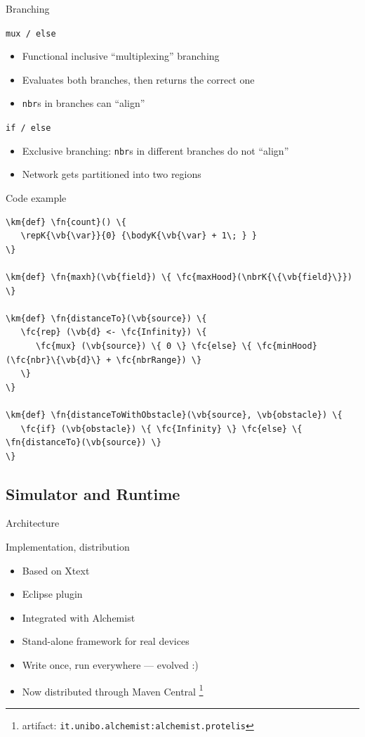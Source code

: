 \documentclass[presentation]{beamer} %
\newcommand{\km}[1]{\textcolor{purple}{#1}} %
\newcommand{\fc}[1]{\textcolor{Fuchsia}{#1}} %
\newcommand{\fn}[1]{\textcolor{blue}{#1}} %
\newcommand{\vb}[1]{\textcolor{OliveGreen}{#1}} %
\newcommand{\bral}{\textrm{{\tt {\char '173}}}\,}
\newcommand{\brar}{\textrm{{\tt {\char '175}}}}
\newcommand{\var}{\texttt{x}}
\newcommand{\bodyK}[1]{\bral\! #1\!\brar}
\newcommand{\repK}[3]{\texttt{\fc{rep}(#1<-#2)}#3}
\newcommand{\nbrK}[1]{\texttt{\fc{nbr}}#1}
\begin{document}
\begin{frame}{Branching}
  \begin{block} {\texttt{mux / else}}
   \begin{itemize}
    \item Functional inclusive ``multiplexing'' branching
    \item Evaluates both branches, then returns the correct one
    \item \texttt{nbr}s in branches can ``align''
   \end{itemize}
  \end{block}
  \begin{block} {\texttt{if / else}}
   \begin{itemize}
    \item Exclusive branching: \texttt{nbr}s in different branches do not ``align''
    \item Network gets partitioned into two regions
   \end{itemize}
  \end{block}
\end{frame}

\begin{frame}[fragile]{Code example}
\begin{Verbatim}[fontsize=\scriptsize, frame=single, commandchars=\\\{\}]
\km{def} \fn{count}() \{
   \repK{\vb{\var}}{0} {\bodyK{\vb{\var} + 1\; } }
\}

\km{def} \fn{maxh}(\vb{field}) \{ \fc{maxHood}(\nbrK{\{\vb{field}\}}) \}

\km{def} \fn{distanceTo}(\vb{source}) \{
   \fc{rep} (\vb{d} <- \fc{Infinity}) \{
      \fc{mux} (\vb{source}) \{ 0 \} \fc{else} \{ \fc{minHood}(\fc{nbr}\{\vb{d}\} + \fc{nbrRange}) \}
   \}
\}

\km{def} \fn{distanceToWithObstacle}(\vb{source}, \vb{obstacle}) \{
   \fc{if} (\vb{obstacle}) \{ \fc{Infinity} \} \fc{else} \{ \fn{distanceTo}(\vb{source}) \}
\}
\end{Verbatim}
\end{frame}

\subsection{Simulator and Runtime}

\begin{frame}{Architecture}
  \begin{block} {Implementation, distribution}
   \begin{itemize}
    \item Based on Xtext
    \item Eclipse plugin
    \item Integrated with Alchemist \cite{alchemist-jos2013}
    \item Stand-alone framework for real devices
    \item Write once, run everywhere --- evolved :)
    \item Now distributed through Maven Central \footnote{artifact: \texttt{it.unibo.alchemist:alchemist.protelis}}
   \end{itemize}
  \end{block}
\end{frame}
\end{document}

